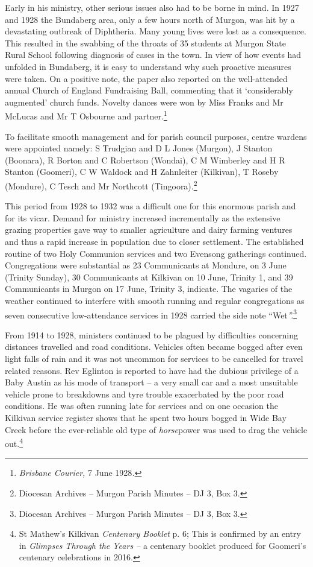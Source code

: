 Early in his ministry, other serious issues also had to be borne in mind. In 1927 and 1928 the Bundaberg area, only a few hours north of Murgon, was hit by a devastating outbreak of Diphtheria. Many young lives were lost as a consequence. This resulted in the swabbing of the throats of 35 students at Murgon State Rural School following diagnosis of cases in the town. In view of how events had unfolded in Bundaberg, it is easy to understand why such proactive measures were taken. On a positive note, the paper also reported on the well-attended annual Church of England Fundraising Ball, commenting that it `considerably augmented' church funds. Novelty dances were won by Miss Franks and Mr McLucas and Mr T Osbourne and partner.\footnote{\emph{Brisbane Courier,} 7 June 1928\emph{.}}


To facilitate smooth management and for parish council purposes, centre wardens were appointed namely: S Trudgian and D L Jones (Murgon), J Stanton (Boonara), R Borton and C Robertson (Wondai), C M Wimberley and H R Stanton (Goomeri), C W Waldock and H Zahnleiter (Kilkivan), T Roseby (Mondure), C Tesch and Mr Northcott (Tingoora).\footnote{Diocesan Archives -- Murgon Parish Minutes -- DJ 3, Box 3.}


This period from 1928 to 1932 was a difficult one for this enormous parish and for its vicar. Demand for ministry increased incrementally as the extensive grazing properties gave way to smaller agriculture and dairy farming ventures and thus a rapid increase in population due to closer settlement. The established routine of two Holy Communion services and two Evensong gatherings continued. Congregations were substantial as 23 Communicants at Mondure, on 3 June (Trinity Sunday), 30 Communicants at Kilkivan on 10 June, Trinity 1, and 39 Communicants in Murgon on 17 June, Trinity 3, indicate. The vagaries of the weather continued to interfere with smooth running and regular congregations as seven consecutive low-attendance services in 1928 carried the side note ``Wet\emph{''.}\footnote{Diocesan Archives -- Murgon Parish Minutes -- DJ 3, Box 3.}


From 1914 to 1928, ministers continued to be plagued by difficulties concerning distances travelled and road conditions. Vehicles often became bogged after even light falls of rain and it was not uncommon for services to be cancelled for travel related reasons. Rev Eglinton is reported to have had the dubious privilege of a Baby Austin as his mode of transport -- a very small car and a most unsuitable vehicle prone to breakdowns and tyre trouble exacerbated by the poor road conditions. He was often running late for services and on one occasion the Kilkivan service register shows that he spent two hours bogged in Wide Bay Creek before the ever-reliable old type of \emph{horse}power was used to drag the vehicle out.\footnote{St Mathew's Kilkivan \emph{Centenary Booklet} p. 6; This is confirmed by an entry in \emph{Glimpses Through the Years --} a centenary booklet produced for Goomeri's centenary celebrations in 2016.}








